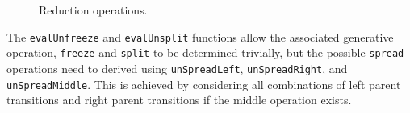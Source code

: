 \documentclass[12pt,a4paper,twoside,openany]{report} \usepackage[pdfborder={0 0 0}]{hyperref}    %
\theoremstyle{definition} \newtheorem{definition}{Definition}[section]
\begin{document}
\begin{figure}[ht]
  \captionsetup{width=.9\linewidth} \caption{Reduction operations.} \label{fig:evalOps} \end{figure}

  The \texttt{evalUnfreeze} and \texttt{evalUnsplit} functions allow the associated generative operation,
  \texttt{freeze} and \texttt{split} to be determined trivially, but the possible \texttt{spread} operations need to
  derived using \texttt{unSpreadLeft}, \texttt{unSpreadRight}, and \texttt{unSpreadMiddle}. This is achieved by
  considering all combinations of left parent transitions and right parent transitions if the middle operation exists. 


%
%
%
%
%
%
\end{document}

